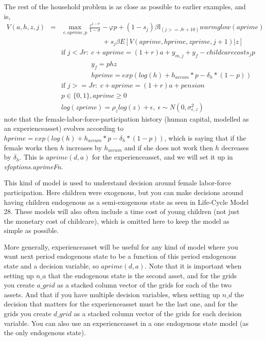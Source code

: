 The rest of the household problem is as close as possible to earlier examples, and is,
\begin{eqnarray*}
 V(a,h,z,j) &=& \max_{c,aprime,p} \frac{c^{1-\sigma}}{1-\sigma} - \varphi p + (1-s_j)\beta  \mathbb{I}_{(j>=Jr+10)} warmglow(aprime)    \\
 && \quad \quad \quad \quad \quad \quad  + s_j \beta E[V(aprime,hprime,zprime,j+1)|z] \\
&& \text{if }j<Jr: \; c+aprime=(1+r)a+ y_{m,j} + y_f - childcarecosts_j p\\
&& \phantom{\text{if }j<Jr:} \; y_f=p h z \\
&& \phantom{\text{if }j<Jr:} \; hprime=exp(log(h)+h_{accum}*p-\delta_h*(1-p)) \\
&& \text{if }j>=Jr: \; c+aprime=(1+r)a +pension \\
&& p \in \{0,1\}, aprime\geq 0 \\
&& log(zprime)=\rho_z log(z) + \epsilon, \; \epsilon \sim N(0,\sigma_{\epsilon,z}^2)
\end{eqnarray*}
note that the female-labor-force-participation history (human capital, modelled as an experienceasset) evolves according to $hprime=exp(log(h)+h_{accum}*p-\delta_h*(1-p))$, which is saying that if the female works then $h$ increases by $h_{accum}$ and if she does not work then $h$ decreases by $\delta_h$. This is $aprime(d,a)$ for the experienceasset, and we will set it up in \textit{vfoptions.aprimeFn}.

This kind of model is used to understand decision around female labor-force participation. Here children were exogenous, but you can make decisions around having children endogenous as a semi-exogenous state as seen in Life-Cycle Model 28. These models will also often include a time cost of young children (not just the monetary cost of childcare), which is omitted here to keep the model as simple as possible.

More generally, experienceasset will be useful for any kind of model where you want next period endogenous state to be a function of this period endogenous state and a decision variable, so $aprime(d,a)$. Note that it is important when setting up $n\_{}a$ that the endogenous state is the second asset, and for the grids you create $a\_{}grid$ as a stacked column vector of the grids for each of the two assets. And that if you have multiple decision variables, when setting up $n\_{}d$ the decision that matters for the experienceasset must be the last one, and for the grids you create $d\_{}grid$ as a stacked column vector of the grids for each decision variable. You can also use an experienceasset in a one endogenous state model (as the only endogenous state).

